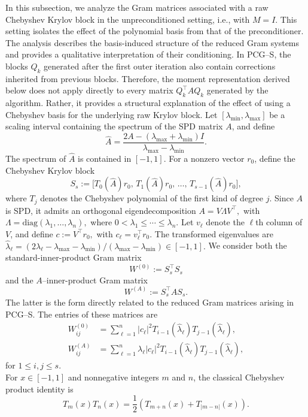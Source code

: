 \documentclass[pdflatex,sn-mathphys-num]{sn-jnl}%
\begin{document}
In this subsection, we analyze the Gram matrices associated with a
raw Chebyshev Krylov block in the unpreconditioned setting, i.e.,
with $M=I$. This setting isolates the effect of the polynomial basis
from that of the preconditioner. The analysis describes the basis-induced structure of the reduced
Gram systems and provides a qualitative interpretation of their conditioning.
In PCG--S, the blocks $Q_k$ generated after the first outer iteration
also contain corrections inherited from previous blocks. Therefore,
the moment representation derived below does not apply directly to
every matrix $Q_k^\top A Q_k$ generated by the algorithm. Rather, it
provides a structural explanation of the effect of using a Chebyshev
basis for the underlying raw Krylov block.
Let $[\lambda_{\min},\lambda_{\max}]$ be a scaling interval containing
the spectrum of the SPD matrix $A$, and define
\[
\widehat A
=
\frac{
2A-(\lambda_{\max}+\lambda_{\min})I
}{
\lambda_{\max}-\lambda_{\min}
}.
\]
The spectrum of $\widehat A$ is contained in $[-1,1]$. For a nonzero
vector $r_0$, define the Chebyshev Krylov block
\[
S_{s}
:=
\bigl[
T_0(\widehat A)r_0,\,
T_1(\widehat A)r_0,\,
\dots,\,
T_{s-1}(\widehat A)r_0
\bigr],
\]
where $T_j$ denotes the Chebyshev polynomial of the first kind of
degree $j$.
Since $A$ is SPD, it admits an orthogonal eigendecomposition $
A=V\Lambda V^\top,$ with
$\Lambda=\mathrm{diag}(\lambda_1,\dots,\lambda_n),$
where $0<\lambda_1\leq\cdots\leq\lambda_n.$
Let $v_\ell$ denote the $\ell$th column of $V$, and define
$
c:=V^\top r_0,$ with $c_\ell=v_\ell^\top r_0.$
The transformed eigenvalues are $
\widehat{\lambda}_\ell
=(
2\lambda_\ell-\lambda_{\max}-\lambda_{\min})/(
\lambda_{\max}-\lambda_{\min})
\in[-1,1].$
We consider both the standard-inner-product Gram matrix
\[
W^{(0)}
:=
S_{s}^\top S_{s}
\]
and the $A$--inner-product Gram matrix
\[
W^{(A)}
:=
S_{s}^\top A S_{s}.
\]
The latter is the form directly related to the reduced Gram matrices
arising in PCG--S.
The entries of these matrices are
\begin{align}
W^{(0)}_{ij}
&=
\sum_{\ell=1}^n
|c_\ell|^2
T_{i-1}(\widehat{\lambda}_\ell)
T_{j-1}(\widehat{\lambda}_\ell),
\label{eq:gram-entry}
\\
W^{(A)}_{ij}
&=
\sum_{\ell=1}^n
\lambda_\ell|c_\ell|^2
T_{i-1}(\widehat{\lambda}_\ell)
T_{j-1}(\widehat{\lambda}_\ell),
\label{eq:A-gram-entry}
\end{align}
for $1\leq i,j\leq s$.\\
For $x\in[-1,1]$ and nonnegative integers $m$ and $n$, the classical Chebyshev product identity is
\begin{equation}
\label{eq:cheb-product}
T_m(x)T_n(x)
=
\frac{1}{2}
\left(
T_{m+n}(x)+T_{|m-n|}(x)
\right).
\end{equation}
\end{document}
